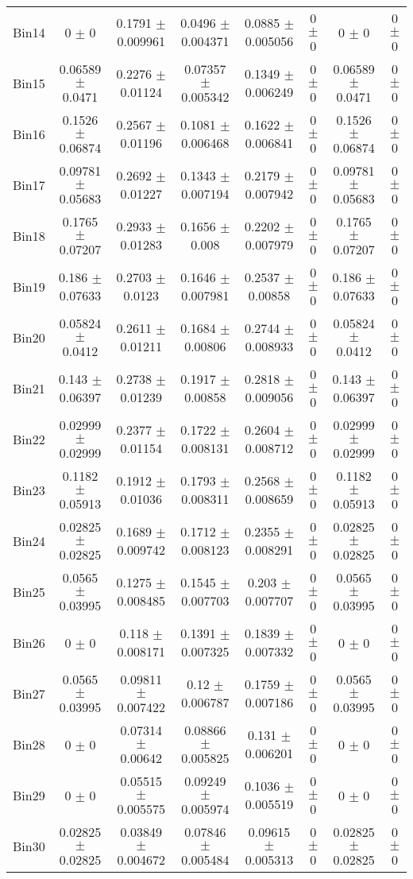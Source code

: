 \begin{tabular}{@{\extracolsep{4pt}}lccccccc@{}}
     Bin14 & 0 $\pm$ 0 & 0.1791 $\pm$ 0.009961 & 0.0496 $\pm$ 0.004371 & 0.0885 $\pm$ 0.005056 & 0 $\pm$ 0 & 0 $\pm$ 0 & 0 $\pm$ 0 \\ 
     Bin15 & 0.06589 $\pm$ 0.0471 & 0.2276 $\pm$ 0.01124 & 0.07357 $\pm$ 0.005342 & 0.1349 $\pm$ 0.006249 & 0 $\pm$ 0 & 0.06589 $\pm$ 0.0471 & 0 $\pm$ 0 \\ 
     Bin16 & 0.1526 $\pm$ 0.06874 & 0.2567 $\pm$ 0.01196 & 0.1081 $\pm$ 0.006468 & 0.1622 $\pm$ 0.006841 & 0 $\pm$ 0 & 0.1526 $\pm$ 0.06874 & 0 $\pm$ 0 \\ 
     Bin17 & 0.09781 $\pm$ 0.05683 & 0.2692 $\pm$ 0.01227 & 0.1343 $\pm$ 0.007194 & 0.2179 $\pm$ 0.007942 & 0 $\pm$ 0 & 0.09781 $\pm$ 0.05683 & 0 $\pm$ 0 \\ 
     Bin18 & 0.1765 $\pm$ 0.07207 & 0.2933 $\pm$ 0.01283 & 0.1656 $\pm$ 0.008 & 0.2202 $\pm$ 0.007979 & 0 $\pm$ 0 & 0.1765 $\pm$ 0.07207 & 0 $\pm$ 0 \\ 
     Bin19 & 0.186 $\pm$ 0.07633 & 0.2703 $\pm$ 0.0123 & 0.1646 $\pm$ 0.007981 & 0.2537 $\pm$ 0.00858 & 0 $\pm$ 0 & 0.186 $\pm$ 0.07633 & 0 $\pm$ 0 \\ 
     Bin20 & 0.05824 $\pm$ 0.0412 & 0.2611 $\pm$ 0.01211 & 0.1684 $\pm$ 0.00806 & 0.2744 $\pm$ 0.008933 & 0 $\pm$ 0 & 0.05824 $\pm$ 0.0412 & 0 $\pm$ 0 \\ 
     Bin21 & 0.143 $\pm$ 0.06397 & 0.2738 $\pm$ 0.01239 & 0.1917 $\pm$ 0.00858 & 0.2818 $\pm$ 0.009056 & 0 $\pm$ 0 & 0.143 $\pm$ 0.06397 & 0 $\pm$ 0 \\ 
     Bin22 & 0.02999 $\pm$ 0.02999 & 0.2377 $\pm$ 0.01154 & 0.1722 $\pm$ 0.008131 & 0.2604 $\pm$ 0.008712 & 0 $\pm$ 0 & 0.02999 $\pm$ 0.02999 & 0 $\pm$ 0 \\ 
     Bin23 & 0.1182 $\pm$ 0.05913 & 0.1912 $\pm$ 0.01036 & 0.1793 $\pm$ 0.008311 & 0.2568 $\pm$ 0.008659 & 0 $\pm$ 0 & 0.1182 $\pm$ 0.05913 & 0 $\pm$ 0 \\ 
     Bin24 & 0.02825 $\pm$ 0.02825 & 0.1689 $\pm$ 0.009742 & 0.1712 $\pm$ 0.008123 & 0.2355 $\pm$ 0.008291 & 0 $\pm$ 0 & 0.02825 $\pm$ 0.02825 & 0 $\pm$ 0 \\ 
     Bin25 & 0.0565 $\pm$ 0.03995 & 0.1275 $\pm$ 0.008485 & 0.1545 $\pm$ 0.007703 & 0.203 $\pm$ 0.007707 & 0 $\pm$ 0 & 0.0565 $\pm$ 0.03995 & 0 $\pm$ 0 \\ 
     Bin26 & 0 $\pm$ 0 & 0.118 $\pm$ 0.008171 & 0.1391 $\pm$ 0.007325 & 0.1839 $\pm$ 0.007332 & 0 $\pm$ 0 & 0 $\pm$ 0 & 0 $\pm$ 0 \\ 
     Bin27 & 0.0565 $\pm$ 0.03995 & 0.09811 $\pm$ 0.007422 & 0.12 $\pm$ 0.006787 & 0.1759 $\pm$ 0.007186 & 0 $\pm$ 0 & 0.0565 $\pm$ 0.03995 & 0 $\pm$ 0 \\ 
     Bin28 & 0 $\pm$ 0 & 0.07314 $\pm$ 0.00642 & 0.08866 $\pm$ 0.005825 & 0.131 $\pm$ 0.006201 & 0 $\pm$ 0 & 0 $\pm$ 0 & 0 $\pm$ 0 \\ 
     Bin29 & 0 $\pm$ 0 & 0.05515 $\pm$ 0.005575 & 0.09249 $\pm$ 0.005974 & 0.1036 $\pm$ 0.005519 & 0 $\pm$ 0 & 0 $\pm$ 0 & 0 $\pm$ 0 \\ 
     Bin30 & 0.02825 $\pm$ 0.02825 & 0.03849 $\pm$ 0.004672 & 0.07846 $\pm$ 0.005484 & 0.09615 $\pm$ 0.005313 & 0 $\pm$ 0 & 0.02825 $\pm$ 0.02825 & 0 $\pm$ 0 \\ 
\hline\hline
  \end{tabular}
